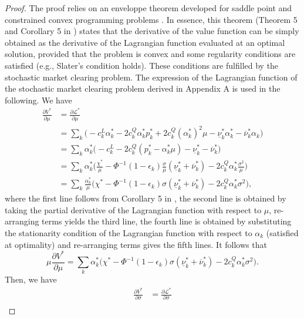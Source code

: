 \documentclass{article}
\begin{document}
\begin{proof}
The proof relies on an enveloppe theorem developed for saddle point and constrained convex programming problems \cite{Milgrom2002}. In essence, this theorem (Theorem 5 and Corollary 5 in \cite{Milgrom2002}) states that the derivative of the value function can be simply obtained as the derivative of the Lagrangian function evaluated at an optimal solution, provided that the problem is convex and some regularity conditions are satisfied (e.g., Slater's condition holds). These conditions are fulfilled by the stochastic market clearing problem. The expression of the Lagrangian function of the stochastic market clearing problem derived in Appendix A is used in the following. We have
\begin{align*} 
\frac{\partial V^*}{\partial \mu} &= \frac{\partial \mathcal{L}^*}{\partial \mu}\\
&= \sum_k\big(-c_k^L \alpha_k^* - 2c_k^Q \alpha_k^* p_k^* + 2 c_k^Q (\alpha_k^*)^2 \mu - \underline{\nu}_k^* \alpha_k^* - \overline{\nu}_k^* \alpha_k \big)\\
&= \sum_k\alpha_k^*\big(-c_k^L-2c_k^Q(p_k^*-\alpha_k^* \mu)-\underline{\nu}_k^*-\overline{\nu}_k^*\big)\\
&= \sum_k\alpha_k^*\Big(\frac{\chi^*}{\mu} - \Phi^{-1}(1-\epsilon_k) \frac{\sigma}{\mu}(\underline{\nu}_k^*+\overline{\nu}_k^*) - 2c_k^Q \alpha_k^* \frac{\sigma^2}{\mu}\Big)\\
&= \sum_k\frac{\alpha_k^*}{\mu}\Big(\chi^* - \Phi^{-1}(1-\epsilon_k) \sigma(\underline{\nu}_k^*+\overline{\nu}_k^*) - 2c_k^Q \alpha_k^* \sigma^2\Big),
\end{align*}
where the first line follows from Corollary 5 in \cite{Milgrom2002}, the second line is obtained by taking the partial derivative of the Lagrangian function with respect to $\mu$, re-arranging terms yields the third line, the fourth line is obtained by substituting the stationarity condition of the Lagrangian function with respect to $\alpha_k$ (satisfied at optimality) and re-arranging terms gives the fifth lines. It follows that
\begin{equation*}
\mu \frac{\partial V^*}{\partial \mu} = \sum_k\alpha_k^*\Big(\chi^* - \Phi^{-1}(1-\epsilon_k) \sigma(\underline{\nu}_k^*+\overline{\nu}_k^*) - 2c_k^Q \alpha_k^* \sigma^2\Big).
\end{equation*}
Then, we have
\begin{align*}
\frac{\partial V^*}{\partial \sigma} &= \frac{\partial \mathcal{L}^*}{\partial \sigma}\\

\end{align*}
\end{proof}
\end{document}
